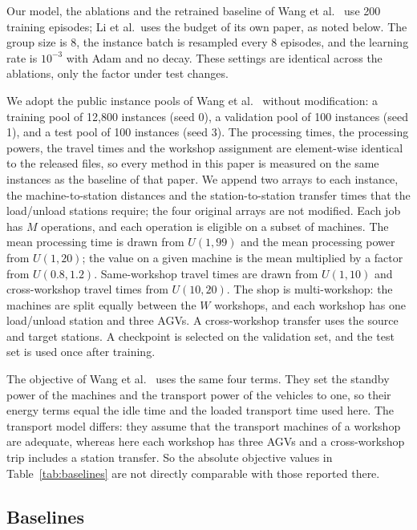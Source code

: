 Our model, the ablations and the retrained baseline of Wang et al.~\cite{wang2025multitarget} use 200 training
episodes; Li et al.\ uses the budget of its own paper, as noted below. The group
size is 8, the instance batch is resampled every 8 episodes, and the learning rate
is $10^{-3}$ with Adam and no decay. These settings are identical across the
ablations, only the factor under test changes.

We adopt the public instance pools of Wang et
al.~\cite{wang2025multitarget} without modification: a training pool of 12{,}800 instances (seed 0), 
a validation pool of 100 instances (seed 1), and a test pool of 100 instances (seed 3). 
The processing times, the processing powers, the
travel times and the workshop assignment are element-wise identical to the
released files, so every method in this paper is measured on the same
instances as the baseline of that paper. We append two arrays to each
instance, the machine-to-station distances and the station-to-station
transfer times that the load/unload stations require; the four original
arrays are not modified. Each job has $M$ operations, and each operation is
eligible on a subset of machines. The mean processing time is drawn from
$U(1,99)$ and the mean processing power from $U(1,20)$; the value on a given
machine is the mean multiplied by a factor from $U(0.8,1.2)$. Same-workshop
travel times are drawn from $U(1,10)$ and cross-workshop travel times from
$U(10,20)$. The shop is multi-workshop: the machines are split equally between
the $W$ workshops, and each workshop has one load/unload station and three AGVs.
A cross-workshop transfer uses the source and target stations. A checkpoint is selected on the validation set,
and the test set is used once after training.

The objective of Wang et al.~\cite{wang2025multitarget} uses the same four
terms. They set the standby power of the machines and the transport power of
the vehicles to one, so their energy terms equal the idle time and the loaded
transport time used here. The transport model differs: they assume that the
transport machines of a workshop are adequate, whereas here each workshop has
three AGVs and a cross-workshop trip includes a station transfer. So the absolute
objective values in Table~\ref{tab:baselines} are not directly
comparable with those reported there.

\subsection{Baselines}

